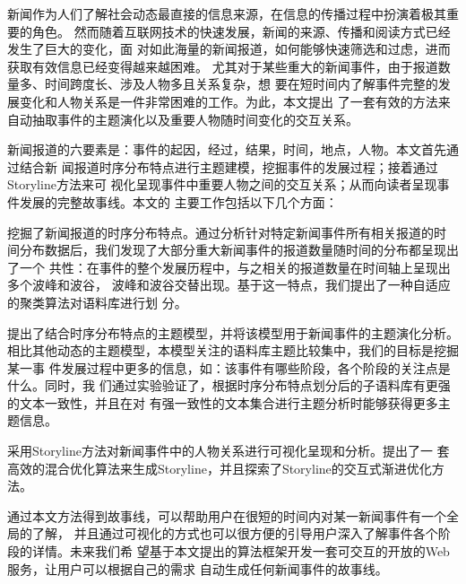 \begin{cabstract}
  新闻作为人们了解社会动态最直接的信息来源，在信息的传播过程中扮演着极其重要的角色。
  然而随着互联网技术的快速发展，新闻的来源、传播和阅读方式已经发生了巨大的变化，面
  对如此海量的新闻报道，如何能够快速筛选和过虑，进而获取有效信息已经变得越来越困难。
  尤其对于某些重大的新闻事件，由于报道数量多、时间跨度长、涉及人物多且关系复杂，想
  要在短时间内了解事件完整的发展变化和人物关系是一件非常困难的工作。为此，本文提出
  了一套有效的方法来自动抽取事件的主题演化以及重要人物随时间变化的交互关系。

  新闻报道的六要素是：事件的起因，经过，结果，时间，地点，人物。本文首先通过结合新
  闻报道时序分布特点进行主题建模，挖掘事件的发展过程；接着通过Storyline方法来可
  视化呈现事件中重要人物之间的交互关系；从而向读者呈现事件发展的完整故事线。本文的
  主要工作包括以下几个方面：

  \begin{asparaenum}[(1)]
    \item 挖掘了新闻报道的时序分布特点。通过分析针对特定新闻事件所有相关报道的时
    间分布数据后，我们发现了大部分重大新闻事件的报道数量随时间的分布都呈现出了一个
    共性：在事件的整个发展历程中，与之相关的报道数量在时间轴上呈现出多个波峰和波谷，
    波峰和波谷交替出现。基于这一特点，我们提出了一种自适应的聚类算法对语料库进行划
    分。
    \item 提出了结合时序分布特点的主题模型，并将该模型用于新闻事件的主题演化分析。
    相比其他动态的主题模型，本模型关注的语料库主题比较集中，我们的目标是挖掘某一事
    件发展过程中更多的信息，如：该事件有哪些阶段，各个阶段的关注点是什么。同时，我
    们通过实验验证了，根据时序分布特点划分后的子语料库有更强的文本一致性，并且在对
    有强一致性的文本集合进行主题分析时能够获得更多主题信息。
    \item 采用Storyline方法对新闻事件中的人物关系进行可视化呈现和分析。提出了一
    套高效的混合优化算法来生成Storyline，并且探索了Storyline的交互式渐进优化方法。
  \end{asparaenum}

  通过本文方法得到故事线，可以帮助用户在很短的时间内对某一新闻事件有一个全局的了解，
  并且通过可视化的方式也可以很方便的引导用户深入了解事件各个阶段的详情。未来我们希
  望基于本文提出的算法框架开发一套可交互的开放的Web服务，让用户可以根据自己的需求
  自动生成任何新闻事件的故事线。

\end{cabstract}


